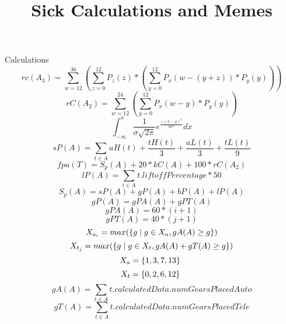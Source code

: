 \documentclass{article}
\title{Sick Calculations and Memes}
\begin{document}
   \maketitle
 	Calculations
 	$$rc(A_3) = \sum_{w=12}^{36} (\sum_{z=0}^{12} P_z(z) * (\sum_{y=0}^{12} P_x(w-(y+z)) * P_y(y)))$$
 	$$rC(A_2) = \sum_{w=12}^{24} (\sum_{y=0}^{12} P_x(w-y) * P_y(y))$$
 	$$\int_{-\infty}^{x} \frac{1}{\sigma\sqrt{2\pi}} e^{\frac{-(x - \mu)^2}{2\sigma^2}} dx$$	
 	$$sP(A) = \sum_{t \in A}^{} aH(t) + \frac{tH(t)}{3} + \frac{aL(t)}{3} + \frac{tL(t)}{9}$$
 	$$fpa(T) = S_p(A) + 20 * kC(A) + 100 * rC(A_2)$$
 	$$lP(A) = \sum_{t \in A}{} t.liftoffPercentage * 50$$
 	$$S_p(A) = sP(A) + gP(A) + bP(A) + lP(A)$$
 	$$gP(A) = gPA(A) + gPT(A)$$
 	$$gPA(A) = 60 * (i + 1)$$
 	$$gPT(A) = 40 * (j + 1)$$
 	$$X_{a_i} = max(\{\\g \mid g \in X_a, gA(A) \geq g\}\\)$$
 	$$X_{t_j} = max(\{\\g \mid g \in X_t, gA(A) + gT(A) \geq g\}\\)$$
 	$$X_a = \{\\1, 3, 7, 13 \}\ $$
 	$$X_t = \{\\0, 2, 6, 12 \}\ $$
	$$gA(A) = \sum_{t \in A}{} t.calculatedData.numGearsPlacedAuto$$
	$$gT(A) = \sum_{t \in A}{} t.calculatedData.numGearsPlacedTele$$
\end{document}
